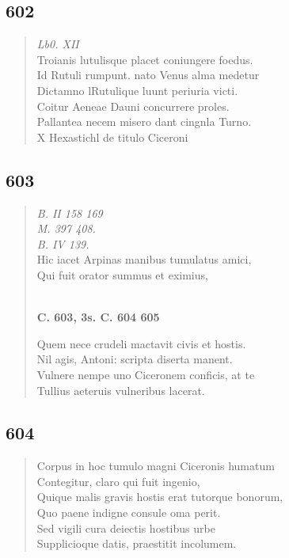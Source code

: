 \documentclass[11pt, a4paper]{report}
\begin{document}
            \subsection*{602}
      \begin{verse}
      \textit{Lb0. XII} \\ Troianis lutulisque placet coniungere foedus. \\ Id Rutuli rumpunt. nato Venus alma medetur \\ Dictamno lRutulique luunt periuria victi. \\ Coitur Aeneae Dauni concurrere proles. \\ Pallantea necem misero dant cingnla Turno. \\ X  \lbrack Hexastichl de titulo Ciceroni \\ 
      \end{verse}
  
            \subsection*{603}
      \begin{verse}
      \textit{B. II 158 169} \\ \textit{M. 397 408.} \\ \textit{B. IV 139.} \\ Hic iacet Arpinas manibus tumulatus amici, \\ Qui fuit orator summus et eximius, \\ 
        ﻿\pagebreak 
    \begin{center} \textbf{C. 603, 3s. C. 604 605} \end{center} \marginpar{[87]} Quem nece crudeli mactavit civis et hostis. \\ Nil agis, Antoni: scripta diserta manent. \\ Vulnere nempe uno Ciceronem conficis, at te \\ Tullius aeteruis vulneribus lacerat. \\ 
      \end{verse}
  
            \subsection*{604}
      \begin{verse}
      Corpus in hoc tumulo magni Ciceronis humatum \\ Contegitur, claro qui fuit ingenio, \\ Quique malis gravis hostis erat tutorque bonorum, \\ Quo paene indigne consule oma perit. \\ Sed vigili cura deiectis hostibus urbe \\ Supplicioque datis, praestitit incolumem. \\ 
      \end{verse}
  
\end{document}
